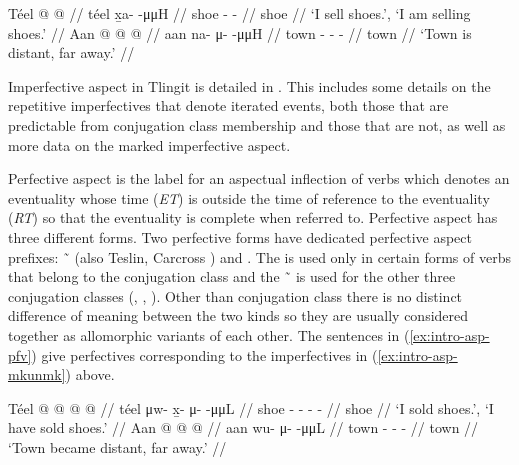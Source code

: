 \documentclass[12pt,letterpaper,oneside,article]{memoir}
\begin{document}
\pex\label{ex:intro-asp-mkunmk}%
\a\label{ex:intro-asp-mkunmk-unmk}%
%
\begingl
	\gla	Téel  @ {} @ {} //
	\glb	téel x̱a-  -μμH //
	\glc	shoe -  - //
	\gld	shoe  {} {} //
	\glft	‘I sell shoes.’, ‘I am selling shoes.’
		//
\endgl
\a\label{ex:intro-asp-mkunmk-mk}%
%
\begingl
	\gla	Aan  @ {} @ {} @ {} //
	\glb	aan na- μ-  -μμH //
	\glc	town - -  - //
	\gld	town  {} {} {} //
	\glft	‘Town is distant, far away.’
		//
\endgl
\xe

Imperfective aspect in Tlingit is detailed in \cite[ch.\ 6 §2.1]{crippen:2019}.
This includes some details on the repetitive imperfectives that denote iterated events, both those that are predictable from conjugation class membership and those that are not, as well as more data on the marked imperfective aspect.

Perfective aspect is the label for an aspectual inflection of verbs which denotes an eventuality whose time (\textit{ET}) is outside the time of reference to the eventuality (\textit{RT}) so that the eventuality is complete when referred to.
Perfective aspect has three different forms.
Two perfective forms have dedicated perfective aspect prefixes:  \~\  (also Teslin, Carcross ) and .
The  is used only in certain forms of verbs that belong to the  conjugation class and the  \~\  is used for the other three conjugation classes (, , ).
Other than conjugation class there is no distinct difference of meaning between the two kinds so they are usually considered together as allomorphic variants of each other.
The sentences in (\ref{ex:intro-asp-pfv}) give perfectives corresponding to the imperfectives in (\ref{ex:intro-asp-mkunmk}) above.

\pex\label{ex:intro-asp-pfv}%
\a\label{ex:intro-asp-pfv-act}%
%
\begingl
	\gla	Téel  @ {} @ {} @ {} @ {} //
	\glb	téel μw- x̱- μ-  -μμL //
	\glc	shoe - - -  - //
	\gld	shoe  {} {} {} {} //
	\glft	‘I sold shoes.’, ‘I have sold shoes.’
		//
\endgl
\a\label{ex:intro-asp-pfv-stv}%
%
\begingl
	\gla	Aan  @ {} @ {} @ {} //
	\glb	aan wu- μ-  -μμL //
	\glc	town - -  - //
	\gld	town  {} {} {} //
	\glft	‘Town became distant, far away.’
		//
\endgl
\xe
\end{document}
